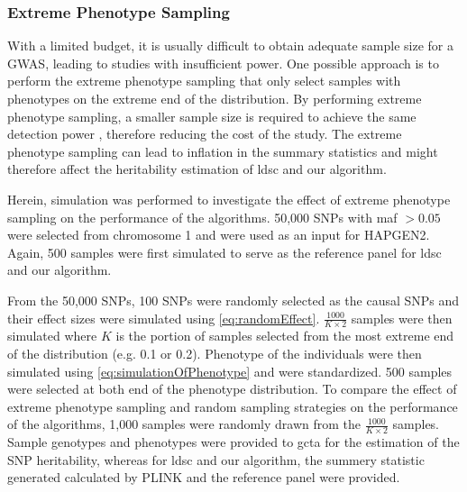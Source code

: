 		\subsubsection{Extreme Phenotype Sampling}
		With a limited budget, it is usually difficult to obtain adequate sample size for a \gls{GWAS}, leading to studies with insufficient power.
		One possible approach is to perform the extreme phenotype sampling that only select samples with phenotypes on the extreme end of the distribution.
		By performing extreme phenotype sampling, a smaller sample size is required to achieve the same detection power \citep{Sham2014}, therefore reducing the cost of the study.
		The extreme phenotype sampling can lead to inflation in the summary statistics \citep{Guey2011} and might therefore affect the heritability estimation of \gls{ldsc} and our algorithm.
		
		Herein, simulation was performed to investigate the effect of extreme phenotype sampling on the performance of the algorithms.
		50,000 \glspl{SNP} with \gls{maf} $>0.05$ were selected from chromosome 1 and were used as an input for HAPGEN2.
		Again, 500 samples were first simulated to serve as the reference panel for \gls{ldsc} and our algorithm.
		
		From the 50,000 \glspl{SNP}, 100 \glspl{SNP} were randomly selected as the causal \glspl{SNP} and their effect sizes were simulated using \cref{eq:randomEffect}.
		$\frac{1000}{K\times2}$ samples were then simulated where $K$ is the portion of samples selected from the most extreme end of the distribution (e.g. 0.1 or 0.2).
		Phenotype of the individuals were then simulated using \cref{eq:simulationOfPhenotype} and were standardized. %
		500 samples were selected at both end of the phenotype distribution.
		To compare the effect of extreme phenotype sampling and random sampling strategies on the performance of the algorithms, 1,000 samples were randomly drawn from the $\frac{1000}{K\times2}$ samples.
		Sample genotypes and phenotypes were provided to \gls{gcta} for the estimation of the \gls{SNP} heritability, whereas for \gls{ldsc} and our algorithm, the summery statistic generated calculated by PLINK \citep{Purcell2003} and the reference panel were provided.
		
